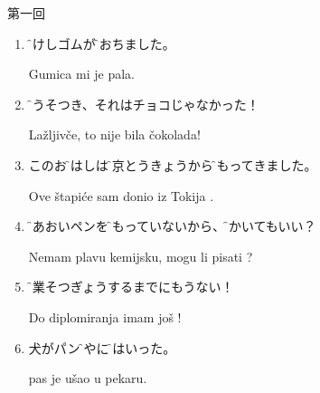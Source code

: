 \documentclass[intermediate]{grampig}
\begin{document}
	{\Large {} \hfill 第一回} \vspace{1em}
	
	\begin{enumerate}
		\item \parbox[t]{\linewidth}{\f{消}{け}しゴムが\f{落}{お}ちました。}
		\bh\strut
		Gumica mi je  pala.
		
		\item \f{嘘}{うそ}つき、それはチョコじゃなかった！
		\bh\strut
		Lažljivče, to nije bila  čokolada!
		
		\item このお\f{箸}{はし}は\f{東京}{とうきょう}から\f{持}{も}ってきました。
		\bh\strut
		Ove štapiće sam donio iz Tokija .
		
		\item \f{青}{あお}いペンを\f{持}{も}っていないから、\f{書}{か}いてもいい？
		\bh\strut
		Nemam plavu kemijsku, mogu li pisati ?
		
		\item \f{卒業}{そつぎょう}するまでにもうない！
		\bh\strut
		Do diplomiranja imam još !
				
		\item {}犬がパン\f{屋}{や}に\f{入}{はい}った。
		\bh\strut
		 pas je ušao u pekaru.
		
	\end{enumerate}
\end{document}

